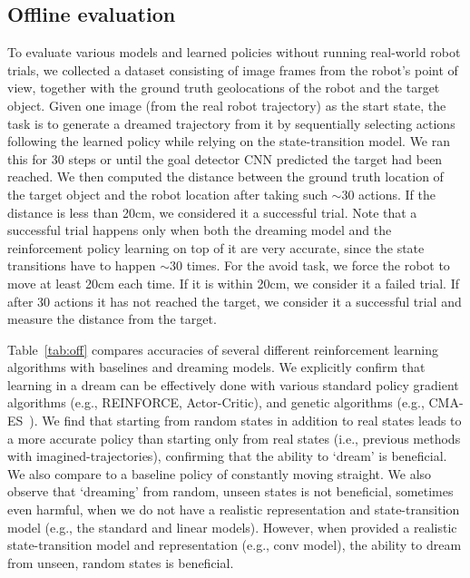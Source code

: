 \documentclass[letterpaper, 10 pt, conference]{ieeeconf}
\begin{document}
\subsection{Offline evaluation}
To evaluate various models and learned policies without running real-world robot trials, we collected a dataset consisting of image frames from the robot's point of view, together with the ground truth geolocations of the robot and the target object.
Given one image (from the real robot trajectory) as the start state, the task is to generate a dreamed trajectory from it by sequentially selecting actions following the learned policy while relying on the state-transition model.
We ran this for 30 steps or until the goal detector CNN predicted the target had been reached. We then computed the distance between the ground truth location of the target object and the robot location after taking such $\sim30$ actions. If the distance is less than 20cm, we considered it a successful trial. Note that a successful trial happens only when both the dreaming model and the reinforcement policy learning on top of it are very accurate, since the state transitions have to happen $\sim30$ times. For the avoid task, we force the robot to move at least 20cm each time. If it is within 20cm, we consider it a failed trial. If after 30 actions it has not reached the target, we consider it a successful trial and measure the distance from the target.




Table~\ref{tab:off} compares accuracies of several different reinforcement learning algorithms with baselines and dreaming models. We explicitly confirm that learning in a dream can be effectively done with various standard policy gradient algorithms (e.g., REINFORCE, Actor-Critic), and genetic algorithms (e.g., CMA-ES~\cite{hansen2003reducing}). We find that starting from random states in addition to real states leads to a more accurate policy than starting only from real states (i.e., previous methods with imagined-trajectories), confirming that the ability to `dream' is beneficial. We also compare to a baseline policy of constantly moving straight. We also observe that `dreaming' from random, unseen states is not beneficial, sometimes even harmful, when we do not have a realistic representation and state-transition model (e.g., the standard and linear models). However, when provided a realistic state-transition model and representation (e.g., conv model), the ability to dream from unseen, random states is beneficial.
\end{document}
